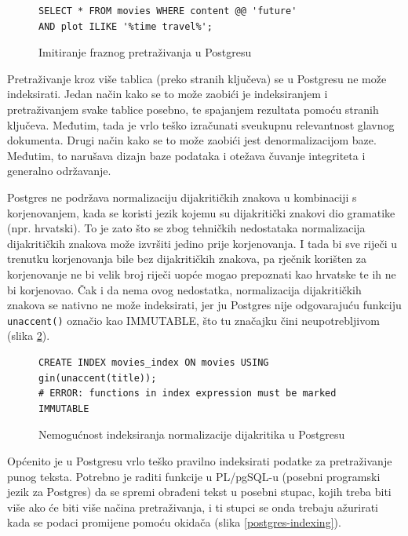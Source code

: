 \documentclass[a4paper,twoside,12pt]{scrreprt}
\begin{document}
\begin{figure}[H]
  \begin{Verbatim}[frame=single]
SELECT * FROM movies WHERE content @@ 'future'
AND plot ILIKE '%time travel%';
  \end{Verbatim}
  \caption{Imitiranje fraznog pretraživanja u Postgresu}
  \label{postgres-phrases}
\end{figure}

Pretraživanje kroz više tablica (preko stranih ključeva) se u Postgresu ne može indeksirati. Jedan način kako se to može zaobići je indeksiranjem i pretraživanjem svake tablice posebno, te spajanjem rezultata pomoću stranih ključeva. Međutim, tada je vrlo teško izračunati sveukupnu relevantnost glavnog dokumenta. Drugi način kako se to može zaobići jest denormalizacijom baze. Međutim, to narušava dizajn baze podataka i otežava čuvanje integriteta i generalno održavanje.

Postgres ne podržava normalizaciju dijakritičkih znakova u kombinaciji s korjenovanjem, kada se koristi jezik kojemu su dijakritički znakovi dio gramatike (npr. hrvatski). To je zato što se zbog tehničkih nedostataka normalizacija dijakritičkih znakova može izvršiti jedino prije korjenovanja. I tada bi sve riječi u trenutku korjenovanja bile bez dijakritičkih znakova, pa rječnik korišten za korjenovanje ne bi velik broj riječi uopće mogao prepoznati kao hrvatske te ih ne bi korjenovao. Čak i da nema ovog nedostatka, normalizacija dijakritičkih znakova se nativno ne može indeksirati, jer ju Postgres nije odgovarajuću funkciju \texttt{unaccent()} označio kao IMMUTABLE, što tu značajku čini neupotrebljivom (slika \ref{postgres-unaccent}).

\begin{figure}[H]
  \begin{Verbatim}[frame=single]
CREATE INDEX movies_index ON movies USING gin(unaccent(title));
# ERROR: functions in index expression must be marked IMMUTABLE
  \end{Verbatim}
  \caption{Nemogućnost indeksiranja normalizacije dijakritika u Postgresu}
  \label{postgres-unaccent}
\end{figure}

Općenito je u Postgresu vrlo teško pravilno indeksirati podatke za pretraživanje punog teksta. Potrebno je raditi funkcije u PL/pgSQL-u (posebni programski jezik za Postgres) da se spremi obrađeni tekst u posebni stupac, kojih treba biti više ako će biti više načina pretraživanja, i ti stupci se onda trebaju ažurirati kada se podaci promijene pomoću okidača (slika \ref{postgres-indexing}).
\end{document}
